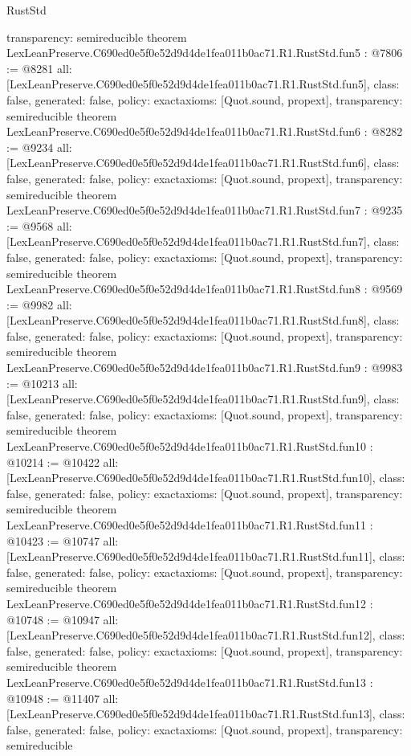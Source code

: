 \begin{lexlean}{RustStd}
\begin{coremodule}
{  transparency: semireducible
}
theorem LexLeanPreserve.C690ed0e5f0e52d9d4de1fea011b0ac71.R1.RustStd.fun5 : @7806 := @8281 {
  all: [LexLeanPreserve.C690ed0e5f0e52d9d4de1fea011b0ac71.R1.RustStd.fun5],
  class: false,
  generated: false,
  policy: exact{axioms: [Quot.sound, propext]},
  transparency: semireducible
}
theorem LexLeanPreserve.C690ed0e5f0e52d9d4de1fea011b0ac71.R1.RustStd.fun6 : @8282 := @9234 {
  all: [LexLeanPreserve.C690ed0e5f0e52d9d4de1fea011b0ac71.R1.RustStd.fun6],
  class: false,
  generated: false,
  policy: exact{axioms: [Quot.sound, propext]},
  transparency: semireducible
}
theorem LexLeanPreserve.C690ed0e5f0e52d9d4de1fea011b0ac71.R1.RustStd.fun7 : @9235 := @9568 {
  all: [LexLeanPreserve.C690ed0e5f0e52d9d4de1fea011b0ac71.R1.RustStd.fun7],
  class: false,
  generated: false,
  policy: exact{axioms: [Quot.sound, propext]},
  transparency: semireducible
}
theorem LexLeanPreserve.C690ed0e5f0e52d9d4de1fea011b0ac71.R1.RustStd.fun8 : @9569 := @9982 {
  all: [LexLeanPreserve.C690ed0e5f0e52d9d4de1fea011b0ac71.R1.RustStd.fun8],
  class: false,
  generated: false,
  policy: exact{axioms: [Quot.sound, propext]},
  transparency: semireducible
}
theorem LexLeanPreserve.C690ed0e5f0e52d9d4de1fea011b0ac71.R1.RustStd.fun9 : @9983 := @10213 {
  all: [LexLeanPreserve.C690ed0e5f0e52d9d4de1fea011b0ac71.R1.RustStd.fun9],
  class: false,
  generated: false,
  policy: exact{axioms: [Quot.sound, propext]},
  transparency: semireducible
}
theorem LexLeanPreserve.C690ed0e5f0e52d9d4de1fea011b0ac71.R1.RustStd.fun10 : @10214 := @10422 {
  all: [LexLeanPreserve.C690ed0e5f0e52d9d4de1fea011b0ac71.R1.RustStd.fun10],
  class: false,
  generated: false,
  policy: exact{axioms: [Quot.sound, propext]},
  transparency: semireducible
}
theorem LexLeanPreserve.C690ed0e5f0e52d9d4de1fea011b0ac71.R1.RustStd.fun11 : @10423 := @10747 {
  all: [LexLeanPreserve.C690ed0e5f0e52d9d4de1fea011b0ac71.R1.RustStd.fun11],
  class: false,
  generated: false,
  policy: exact{axioms: [Quot.sound, propext]},
  transparency: semireducible
}
theorem LexLeanPreserve.C690ed0e5f0e52d9d4de1fea011b0ac71.R1.RustStd.fun12 : @10748 := @10947 {
  all: [LexLeanPreserve.C690ed0e5f0e52d9d4de1fea011b0ac71.R1.RustStd.fun12],
  class: false,
  generated: false,
  policy: exact{axioms: [Quot.sound, propext]},
  transparency: semireducible
}
theorem LexLeanPreserve.C690ed0e5f0e52d9d4de1fea011b0ac71.R1.RustStd.fun13 : @10948 := @11407 {
  all: [LexLeanPreserve.C690ed0e5f0e52d9d4de1fea011b0ac71.R1.RustStd.fun13],
  class: false,
  generated: false,
  policy: exact{axioms: [Quot.sound, propext]},
  transparency: semireducible
}
\end{coremodule}
\end{lexlean}
